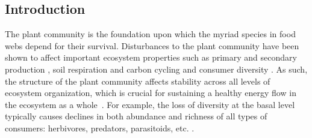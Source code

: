 \documentclass[12pt]{article}
\begin{document}
\begin{spacing}{2.0}

\clearpage
\section*{Introduction} %

     The plant community is the foundation upon which the myriad species in food webs depend for their survival.
     Disturbances to the plant community have been shown to affect important ecosystem properties such as primary \citep{Hector1999} and secondary production \citep{borer2012plant}, soil respiration and carbon cycling \citep{chen2019plant} and consumer diversity \citep{scherber2010bottom, Baiser2016}.
     As such, the structure of the plant community affects stability across all levels of ecosystem organization, which is crucial for sustaining a healthy energy flow in the ecosystem as a whole~\citep{proulx2010diversity, scherber2010bottom, Rosenblatt2016}. 
     For example, the loss of diversity at the basal level typically causes declines in both abundance and richness of all types of consumers: herbivores, predators, parasitoids, etc. \citep{scherber2010bottom}.



\end{spacing}
\end{document}
